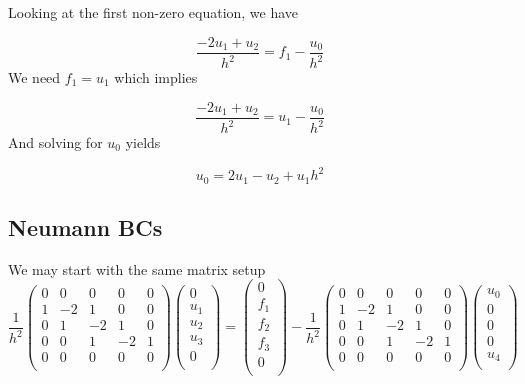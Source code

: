 \documentclass[11pt]{article}
\begin{document}
Looking at the first non-zero equation, we have

\begin{equation}
	\frac{-2u_1+u_2}{h^2} = f_1 - \frac{u_0}{h^2}
\end{equation}
We need $f_1 = u_1$ which implies

\begin{equation}
	\frac{-2u_1+u_2}{h^2} = u_1 - \frac{u_0}{h^2}
\end{equation}
And solving for $u_0$ yields

\begin{equation}
	u_0 = 2u_1 - u_2 + u_1h^2
\end{equation}

\subsection{Neumann BCs}
We may start with the same matrix setup
\begin{equation}
\frac{1}{h^2}
 \begin{pmatrix}
  0 &  0 &  0 &  0 &  0 \\
  1 & -2 &  1 &  0 &  0 \\
  0 &  1 & -2 &  1 &  0 \\
  0 &  0 &  1 & -2 &  1 \\
  0 &  0 &  0 &  0 &  0 \\
 \end{pmatrix}
 \begin{pmatrix}
  0 \\  u_1 \\  u_2 \\  u_3 \\  0 \\
 \end{pmatrix}
  =
 \begin{pmatrix}
  0 \\  f_1 \\  f_2 \\  f_3 \\  0 \\
 \end{pmatrix}
   -
\frac{1}{h^2}
 \begin{pmatrix}
  0 &  0 &  0 &  0 &  0 \\
  1 & -2 &  1 &  0 &  0 \\
  0 &  1 & -2 &  1 &  0 \\
  0 &  0 &  1 & -2 &  1 \\
  0 &  0 &  0 &  0 &  0 \\
 \end{pmatrix}
 \begin{pmatrix}
  u_0 \\  0 \\  0 \\  0 \\  u_4 \\
 \end{pmatrix}
\end{equation}
\end{document}
